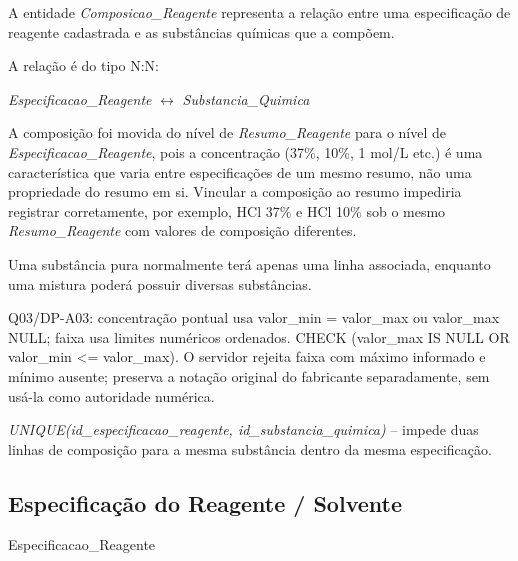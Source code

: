 \begin{explicacao}
A entidade \textit{Composicao\_Reagente} representa a relação entre uma especificação de reagente cadastrada e as substâncias químicas que a compõem.

A relação é do tipo N:N:

\begin{center}
\textit{Especificacao\_Reagente} $\leftrightarrow$ \textit{Substancia\_Quimica}
\end{center}

A composição foi movida do nível de \textit{Resumo\_Reagente} para o nível de \textit{Especificacao\_Reagente}, pois a concentração (37\%, 10\%, 1 mol/L etc.) é uma característica que varia entre especificações de um mesmo resumo, não uma propriedade do resumo em si. Vincular a composição ao resumo impediria registrar corretamente, por exemplo, HCl 37\% e HCl 10\% sob o mesmo \textit{Resumo\_Reagente} com valores de composição diferentes.

Uma substância pura normalmente terá apenas uma linha associada, enquanto uma mistura poderá possuir diversas substâncias.

Q03/DP-A03: concentração pontual usa valor\_min = valor\_max ou valor\_max NULL; faixa usa limites numéricos ordenados. CHECK (valor\_max IS NULL OR valor\_min <= valor\_max). O servidor rejeita faixa com máximo informado e mínimo ausente; preserva a notação original do fabricante separadamente, sem usá-la como autoridade numérica.
\end{explicacao}

\begin{regra}
\textit{UNIQUE(id\_especificacao\_reagente, id\_substancia\_quimica)} -- impede duas linhas de composição para a mesma substância dentro da mesma especificação.
\end{regra}

\subsection{Especificação do Reagente / Solvente}
\begin{entidade}{Especificacao\_Reagente}
\end{entidade}

